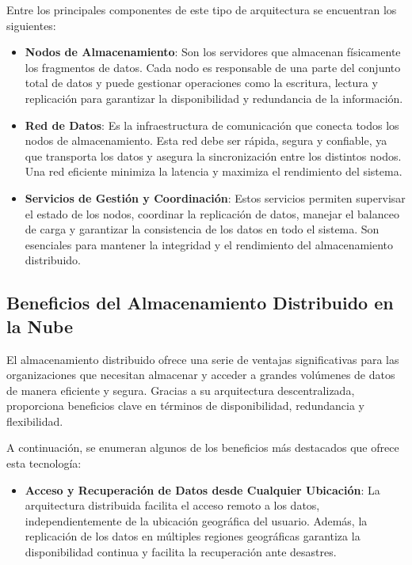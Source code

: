 {            Entre los principales componentes de este tipo de arquitectura se encuentran los siguientes:
            
            \begin{itemize}
                \item \textbf{Nodos de Almacenamiento}: Son los servidores que almacenan físicamente los fragmentos de datos. Cada nodo es responsable de una parte del conjunto total de datos y puede gestionar operaciones como la escritura, lectura y replicación para garantizar la disponibilidad y redundancia de la información.
            
                \item \textbf{Red de Datos}: Es la infraestructura de comunicación que conecta todos los nodos de almacenamiento. Esta red debe ser rápida, segura y confiable, ya que transporta los datos y asegura la sincronización entre los distintos nodos. Una red eficiente minimiza la latencia y maximiza el rendimiento del sistema.
            
                \item \textbf{Servicios de Gestión y Coordinación}: Estos servicios permiten supervisar el estado de los nodos, coordinar la replicación de datos, manejar el balanceo de carga y garantizar la consistencia de los datos en todo el sistema. Son esenciales para mantener la integridad y el rendimiento del almacenamiento distribuido.
            \end{itemize}
            
        \subsection{Beneficios del Almacenamiento Distribuido en la Nube}
            
            El almacenamiento distribuido ofrece una serie de ventajas significativas para las organizaciones que necesitan almacenar y acceder a grandes volúmenes de datos de manera eficiente y segura. Gracias a su arquitectura descentralizada, proporciona beneficios clave en términos de disponibilidad, redundancia y flexibilidad.
            
            A continuación, se enumeran algunos de los beneficios más destacados que ofrece esta tecnología:
            
            \begin{itemize}
                \item \textbf{Acceso y Recuperación de Datos desde Cualquier Ubicación}: La arquitectura distribuida facilita el acceso remoto a los datos, independientemente de la ubicación geográfica del usuario. Además, la replicación de los datos en múltiples regiones geográficas garantiza la disponibilidad continua y facilita la recuperación ante desastres.
            

\end{itemize}}
